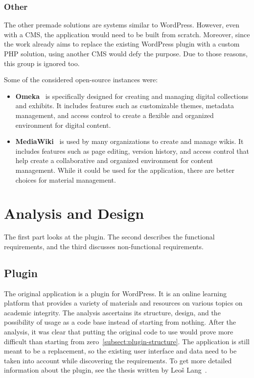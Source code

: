 \documentclass[
  digital,     %
  oneside,     %
  nosansbold,  %
  colorbold, %
  lof,         %
  lot,         %
]{fithesis4}
\begin{document}
\subsection{Other}

The other premade solutions are systems similar to WordPress. However, even with a CMS, the application would need to be built from scratch. Moreover, since the work already aims to replace the existing WordPress plugin with a custom PHP solution, using another CMS would defy the purpose. Due to those reasons, this group is ignored too.

Some of the considered open-source instances were:
\begin{itemize}

	\item \textbf{Omeka}~\cite{https://omeka.org/} is specifically designed for creating and managing digital collections and exhibits. It includes features such as customizable themes, metadata management, and access control to create a flexible and organized environment for digital content.
	
	\item \textbf{MediaWiki}~\cite{https://www.mediawiki.org/wiki/MediaWiki} is used by many organizations to create and manage wikis. It includes features such as page editing, version history, and access control that help create a collaborative and organized environment for content management. While it could be used for the application, there are better choices for material management.

\end{itemize}

\chapter{Analysis and Design}
\label{chap:analysis}

The first part looks at the plugin. The second describes the functional requirements,
and the third discusses \mbox{non-functional} requirements.

\section{Plugin}
\label{sect:plugin}

The original application is a plugin for WordPress. It is an online learning platform that provides a variety of materials and resources on various topics on academic integrity. The analysis ascertains its structure, design, and the possibility of usage as a code base instead of starting from nothing. After the analysis, it was clear that putting the original code to use would prove more difficult than starting from zero~\ref{subsect:plugin-structure}. The application is still meant to be a replacement, so the existing user interface and data need to be taken into account while discovering the requirements. To get more detailed information about the plugin, see the thesis written by Leoš Lang~\cite{lang18}.
\end{document}
